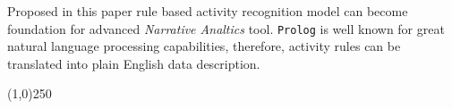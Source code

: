 \documentclass[11pt, a4paper, pdflatex, leqno, twoside, openright]{report}
\begin{document}
Proposed in this paper rule based activity recognition model can become foundation for advanced \emph{Narrative Analtics} tool. \texttt{Prolog} is well known for great natural language processing capabilities, therefore, activity rules can be translated into plain English data description.

\begin{center}
\noindent \line(1,0){250}
\end{center}
\newpage
\thispagestyle{empty}%
\mbox{}

\cleardoublepage
{}
  {}
  
\cleardoublepage
{}
\end{document}
